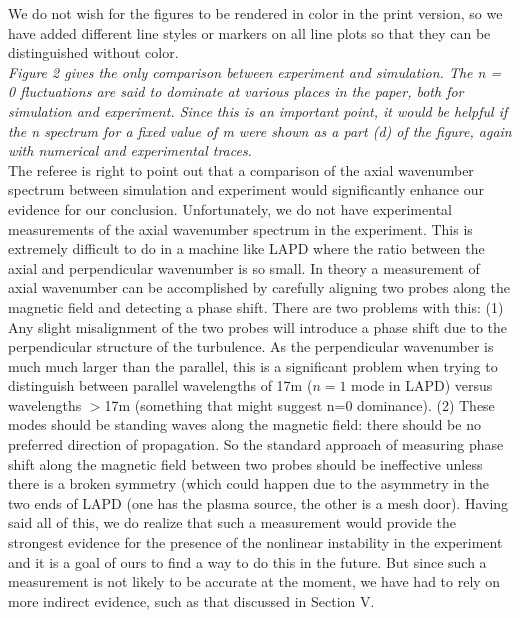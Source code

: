 \documentclass[12pt]{article}
\begin{document}
{\noindent We do not wish for the figures to be rendered in color in the print version, so we have added different line styles or markers on all line plots so that they can be 
distinguished without color. }\\

{\noindent \itshape   Figure 2 gives the only comparison between experiment and simulation. The n = 0
fluctuations are said to dominate at various places in the paper, both for simulation and
experiment. Since this is an important point, it would be helpful if the n spectrum for a
fixed value of m were shown as a part (d) of the figure, again with numerical and
experimental traces. }\\

{\noindent The referee is right to point out that a comparison of the axial wavenumber spectrum between simulation and experiment would significantly enhance our evidence for our conclusion.  Unfortunately, we do not have experimental measurements of the axial wavenumber spectrum in the experiment. This is extremely difficult to do in a machine like LAPD where the ratio between the axial and perpendicular wavenumber is so small.  In theory a measurement of axial wavenumber can be accomplished by carefully aligning two probes along the magnetic field and detecting a phase shift.  There are two problems with this: (1) Any slight misalignment of the two probes will introduce a phase shift due to the perpendicular structure of the turbulence.  As the perpendicular wavenumber is much much larger than the parallel, this is a significant problem when trying to distinguish between parallel wavelengths of 17m ($n=1$ mode in LAPD) versus wavelengths $>$17m (something that might suggest n=0 dominance).  (2) These modes should be standing waves along the magnetic field:  there should be no preferred direction of propagation.  So the standard approach of measuring phase shift along the magnetic field between two probes should be ineffective unless there is a broken symmetry (which could happen due to the asymmetry in the two ends of LAPD (one has the plasma source, the other is a mesh door).  Having said all of this, we do realize that such a measurement would provide the strongest evidence for the presence of the nonlinear instability in the experiment and it is a goal of ours to find a way to do this in the future. 
But since such a measurement is not likely to be accurate at the moment, we have had to rely on more indirect evidence, such as that discussed in Section V. }\\
   
\end{document}
